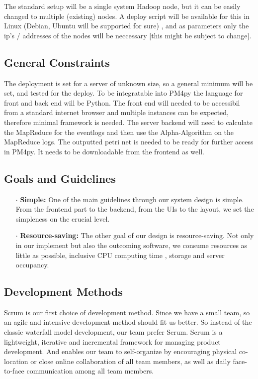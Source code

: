 \documentclass[runningheads]{llncs}
\begin{document}
\noindent
The standard setup will be a single system Hadoop node, but it can be easily changed to multiple (existing) nodes. A deploy script will be available for this in Linux (Debian, Ubuntu will be supported for sure) , and as parameters only the ip's / addresses of the nodes will be neccessary [this might be subject to change].

\subsection{General Constraints}

The deployment is set for a server of unknown size, so a general minimum will be set, and tested for the deploy. To be integratable into PM4py the language for front and back end will be Python. The front end will needed to be accessibil from a standard internet browser and multiple instances can be expected, therefore minimal framework is needed. The server backend will need to calculate the MapReduce for the eventlogs and then use the Alpha-Algorithm on the MapReduce logs. The outputted petri net is needed to be ready for further access in PM4py. It needs to be downloadable from the frontend as well.

\subsection{Goals and Guidelines}

\begin{itemize}
	\item[\Large $\cdot$] \textbf{Simple:}
	One of the main guidelines through our system design is simple. From the frontend part to the backend, from the UIs to the layout, we set the simpleness on the crucial level.\\
	\item[\Large $\cdot$] \textbf{Resource-saving:}
	The other goal of our design is resource-saving. Not only in our implement but also the outcoming software, we consume resources as little as possible, inclusive CPU computing time , storage and server occupancy.
\end{itemize}

\subsection{Development Methods}

Scrum is our first choice of development method. Since we have a small team, so an agile and intensive development method should fit us better. So instead of the classic waterfall model development, our team prefer Scrum. Scrum is a lightweight, iterative and incremental framework for managing product development. And enables our team to self-organize by encouraging physical co-location or close online collaboration of all team members, as well as daily face-to-face communication among all team members.\cite{wiki:xxx}
\end{document}
